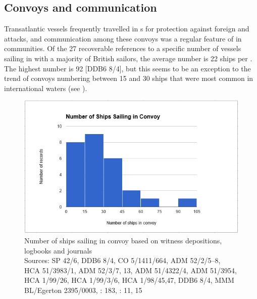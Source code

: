 \subsection{{Convoys and communication}}\label{sec:4.3.2}

Transatlantic vessels frequently travelled in s for protection against foreign and  attacks, and communication among these convoys was a regular feature of  in  communities. Of the 27 recoverable references to a specific number of vessels sailing in  with a majority of British sailors, the average number is 22 ships per . The highest number is 92 [DDB6 8/4], but this seems to be an exception to the trend of convoys numbering between 15 and 30 ships that were most common in international waters (see ). 

\begin{figure}
\includegraphics[width=\textwidth]{figures/delgado-img15.png}
\caption{\label{fig:key:4.7} Number of ships sailing in convoy based on witness depositions, logbooks and journals\\
{\tiny
Sources: SP 42/6, DDB6 8/4, CO 5/1411/664, ADM 52/2/5–8, HCA 51/3983/1, ADM 52/3/7, 13, ADM 51/4322/4, ADM 51/3954, HCA 1/99/26, HCA 1/99/3/6, HCA 1/98/45,47, DDB6 8/4, MMM BL/Egerton 2395/0003, \citealt{Bicheno2012}: 183, \citealt{Gage1648}: 11, 15
}
}
\end{figure}

